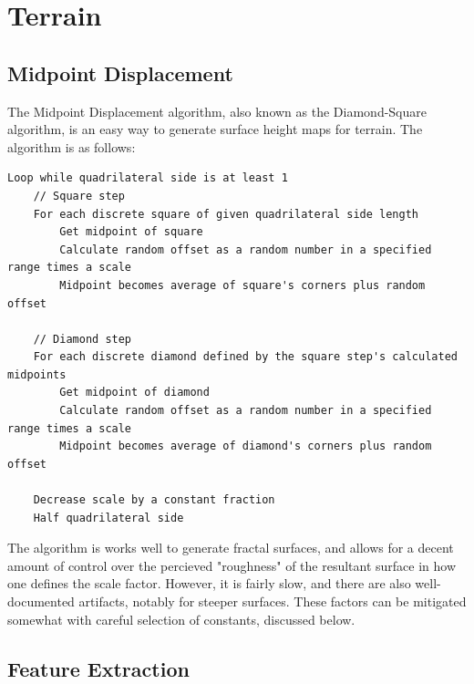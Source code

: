 \documentclass{article}
\newcommand{\tab}{\hspace*{2em}}
\begin{document}

    \section{Terrain}
        \subsection{Midpoint Displacement}
    \tab The Midpoint Displacement algorithm, also known as the Diamond-Square algorithm, is an easy
way to generate surface height maps for terrain. The algorithm is as follows\cite{martz97}:
    \begin{verbatim}
Loop while quadrilateral side is at least 1
    // Square step
    For each discrete square of given quadrilateral side length
        Get midpoint of square
        Calculate random offset as a random number in a specified range times a scale
        Midpoint becomes average of square's corners plus random offset

    // Diamond step
    For each discrete diamond defined by the square step's calculated midpoints
        Get midpoint of diamond
        Calculate random offset as a random number in a specified range times a scale
        Midpoint becomes average of diamond's corners plus random offset

    Decrease scale by a constant fraction
    Half quadrilateral side

    \end{verbatim}


    \tab The algorithm is works well to generate fractal surfaces, and allows for a decent amount
of control over the percieved "roughness" of the resultant surface in how one defines the scale
factor. However, it is fairly slow, and there are also well-documented artifacts, notably for
steeper surfaces. These factors can be mitigated somewhat with careful selection of constants,
discussed below.

        \subsection{Feature Extraction}
\end{document}
